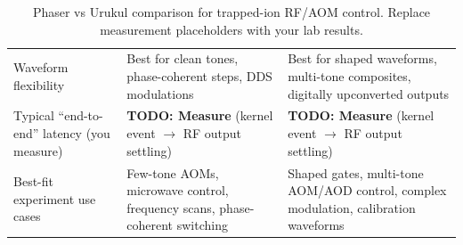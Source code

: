 \begin{table}[t]
\begin{tabularx}{\linewidth}{lXX}
Waveform flexibility
& Best for clean tones, phase-coherent steps, DDS modulations
& Best for shaped waveforms, multi-tone composites, digitally upconverted outputs \\

Typical ``end-to-end'' latency (you measure)
& \textbf{TODO: Measure} (kernel event $\rightarrow$ RF output settling)
& \textbf{TODO: Measure} (kernel event $\rightarrow$ RF output settling) \\

Best-fit experiment use cases
& Few-tone AOMs, microwave control, frequency scans, phase-coherent switching
& Shaped gates, multi-tone AOM/AOD control, complex modulation, calibration waveforms \\

\bottomrule
\end{tabularx}
\caption{Phaser vs Urukul comparison for trapped-ion RF/AOM control. Replace measurement placeholders with
your lab results.}
\label{tab:phaser_vs_urukul}
\end{table}
